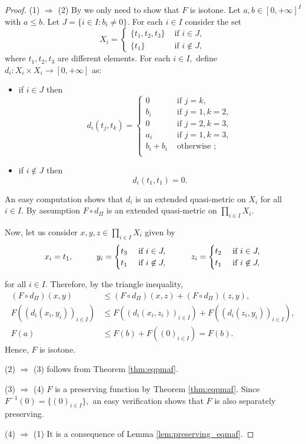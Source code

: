 \documentclass[11pt,a4paper]{amsart}
\theoremstyle{definition}
\begin{document}
	
	\begin{proof}
		(1) $\Rightarrow$ (2) By \cite[Theorem 9]{MassaVale13} we only need to show that $F$ is isotone. Let $a,b\in [0,+\infty]^I$ with $a\leq b.$ Let $J=\{i\in I: b_i\neq 0\}.$ For each $i\in I$ consider the set
		$$X_i=\begin{cases}
			\{t_1,t_2,t_3\}&\text{ if }i\in J,\\
			\{t_1\}&\text{ if }i\not\in J,
		\end{cases}$$
		where $t_1,t_2,t_3$ are different elements. For each $i\in I,$ define $d_i:X_i\times X_i\to [0,+\infty]$ as:
		\begin{itemize}
			\item if $i\in J$ then
			$$d_i(t_j,t_k)=\begin{cases}
				0&\text{ if }j=k,\\
				b_i&\text{ if }j=1,k=2,\\
				0&\text{ if }j=2,k=3,\\
				a_i&\text{ if }j=1,k=3,\\
				b_i+b_i&\text{ otherwise };\\
			\end{cases}$$
			\item if $i\not\in J$ then
			$$d_i(t_1,t_1)=0.$$
		\end{itemize}
		An easy computation shows that $d_i$ is an extended quasi-metric on $X_i$ for all $i\in I.$ By assumption $F\circ d_\Pi$ is an extended quasi-metric on $\prod_{i\in I}X_i.$
		
		Now, let us consider $x,y,z\in \prod_{i\in I} X_i$ given by 
		$$x_i=t_1,\hspace*{1cm}y_i=\begin{cases} t_3&\text{ if }i\in J,\\
			t_1&\text{ if }i\not\in J,\end{cases}\hspace*{1cm}z_i=\begin{cases} t_2&\text{ if }i\in J,\\
			t_1&\text{ if }i\not\in J,\end{cases}
		$$
		
		for all $i\in I.$ Therefore, by the triangle inequality,
		\begin{align*}
			(F\circ d_\Pi)(x,y)&\leq (F\circ d_\Pi)(x,z)+(F\circ d_\Pi)(z,y),\\
			F((d_i(x_i,y_i))_{i\in I})&\leq F((d_i(x_i,z_i))_{i\in I})+F((d_i(z_i,y_i))_{i\in I}),\\
			F(a)&\leq F(b)+F((0)_{i\in I})=F(b).
		\end{align*}
		Hence, $F$ is isotone.
		
		
		(2) $\Rightarrow$ (3) follows from Theorem \ref{thm:eqpmaf}. 
		
		(3) $\Rightarrow$ (4) $F$ is a preserving function by Theorem \ref{thm:eqpmaf}. Since $F^{-1}(0)=\{(0)_{i\in I}\},$ an easy verification shows that $F$ is also separately preserving.
		
		(4) $\Rightarrow$ (1) It is a consequence of Lemma \ref{lem:preserving_eqmaf}.
	\end{proof}
	
\end{document}
